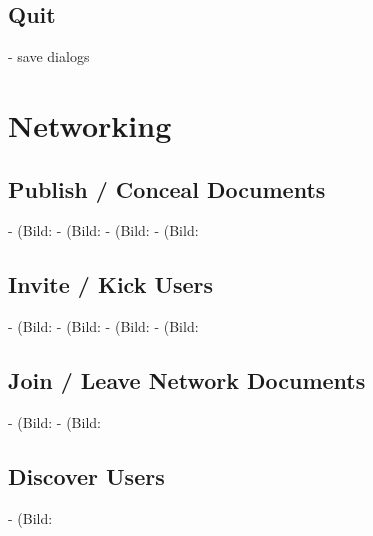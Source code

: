 \documentclass[11pt,a4paper]{article}
\begin{document}
\subsection{Quit}
- save dialogs




\newpage
\section{Networking}

\subsection{Publish / Conceal Documents}
- (Bild: %
- (Bild: %
- (Bild: %
- (Bild: %

\subsection{Invite / Kick Users}
- (Bild: %
- (Bild: %
- (Bild: %
- (Bild: %

\subsection{Join / Leave Network Documents}
- (Bild: %
- (Bild: %

\subsection{Discover Users}
- (Bild: %
\end{document}
